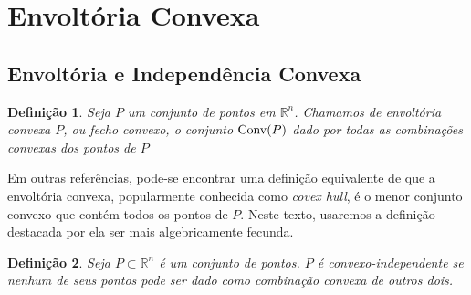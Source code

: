 \newtheorem{def:convex hull}{Definição}[section]
\newtheorem{def:independencia convexa}[def:convex hull]{Definição}
\newtheorem{def:simplex}[def:convex hull]{Definição}


\newtheorem{prop:redundancia}[def:convex hull]{Proposição}[section]



\newtheorem{lemma:afim}{Lema}[section]


\newtheorem{thm:caratheodory}{Teorema}[section]



\newtheorem{cor:caratheodory}{Corolário}[section]

\section{Envoltória Convexa}

\subsection{Envoltória e Independência Convexa}

\begin{def:convex hull}
	\label{def:convex hull}
	Seja $P$ um conjunto de pontos em $\mathbb{R}^n$. Chamamos de envoltória convexa $P$, ou fecho convexo, o conjunto 
	$\mathrm{Conv}(P)$ dado por todas as combinações convexas dos pontos de $P$
\end{def:convex hull}

Em outras referências, pode-se encontrar uma definição equivalente de que a envoltória convexa, popularmente conhecida como \textit{covex hull},
é o menor conjunto convexo que contém todos os pontos de $P$. Neste texto, usaremos a definição
destacada por ela ser mais algebricamente fecunda.

\begin{def:independencia convexa}
	Seja $P \subset \mathbb{R}^n$ é um conjunto de pontos. $P$ é convexo-independente 
	se nenhum de seus pontos pode ser dado como combinação convexa de outros dois.
\end{def:independencia convexa}

